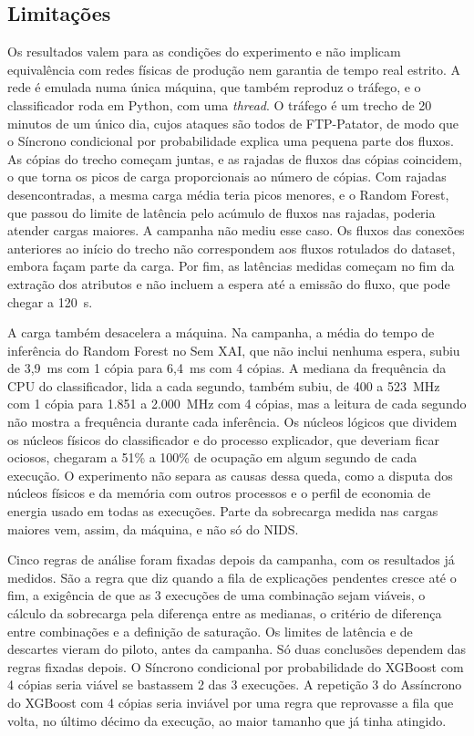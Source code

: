\documentclass[
  article,
  12pt,
  oneside,
  a4paper,
  english,
  brazil
]{abntex2}
\begin{document}
\subsection{Limitações}
\label{sec:limitacoes}

Os resultados valem para as condições do experimento e não implicam equivalência com redes físicas
de produção nem garantia de tempo real estrito. A rede é emulada numa única máquina, que também
reproduz o tráfego, e o classificador roda em Python, com uma \emph{thread}. O tráfego é um trecho de
20 minutos de um único dia, cujos ataques são todos de FTP-Patator, de modo que o Síncrono condicional
por probabilidade explica uma pequena parte dos fluxos. As cópias do trecho começam juntas, e as
rajadas de fluxos das cópias coincidem, o que torna os picos de carga proporcionais ao número de
cópias. Com rajadas desencontradas, a mesma carga média teria picos menores, e o Random Forest, que
passou do limite de latência pelo acúmulo de fluxos nas rajadas, poderia atender cargas maiores. A
campanha não mediu esse caso. Os fluxos das conexões anteriores ao início do trecho não correspondem
aos fluxos rotulados do dataset, embora façam parte da carga. Por fim, as latências medidas começam
no fim da extração dos atributos e não incluem a espera até a emissão do fluxo, que pode chegar a
120~s.

A carga também desacelera a máquina. Na campanha, a média do tempo de inferência do Random Forest no
Sem XAI, que não inclui nenhuma espera, subiu de 3,9~ms com 1 cópia para 6,4~ms com 4 cópias. A
mediana da frequência da CPU do classificador, lida a cada segundo, também subiu, de 400 a 523~MHz
com 1 cópia para 1.851 a 2.000~MHz com 4 cópias, mas a leitura de cada segundo não mostra a
frequência durante cada inferência. Os núcleos lógicos que dividem os núcleos físicos do
classificador e do processo explicador, que deveriam ficar ociosos, chegaram a 51\% a 100\% de
ocupação em algum segundo de cada execução. O experimento não separa as causas dessa queda, como a
disputa dos núcleos físicos e da memória com outros processos e o perfil de economia de energia
usado em todas as execuções. Parte da sobrecarga medida nas cargas maiores vem, assim, da máquina, e
não só do NIDS.

Cinco regras de análise foram fixadas depois da campanha, com os resultados já medidos. São a regra
que diz quando a fila de explicações pendentes cresce até o fim, a exigência de que as 3 execuções
de uma combinação sejam viáveis, o cálculo da sobrecarga pela diferença entre as medianas, o
critério de diferença entre combinações e a definição de saturação. Os limites de latência e de
descartes vieram do piloto, antes da campanha. Só duas conclusões dependem das regras fixadas
depois. O Síncrono condicional por probabilidade do XGBoost com 4 cópias seria viável se bastassem 2
das 3 execuções. A repetição 3 do Assíncrono do XGBoost com 4 cópias seria inviável por uma regra que
reprovasse a fila que volta, no último décimo da execução, ao maior tamanho que já tinha atingido.
\end{document}
